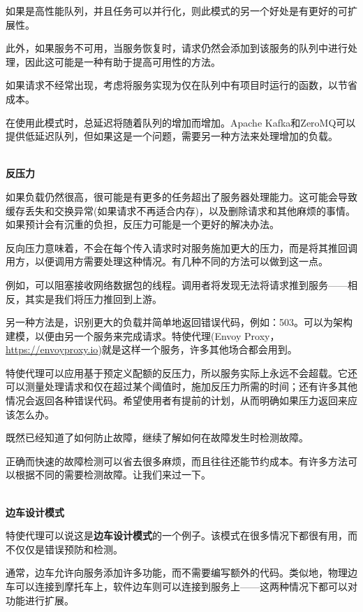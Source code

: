 如果是高性能队列，并且任务可以并行化，则此模式的另一个好处是有更好的可扩展性。

此外，如果服务不可用，当服务恢复时，请求仍然会添加到该服务的队列中进行处理，因此这可能是一种有助于提高可用性的方法。

如果请求不经常出现，考虑将服务实现为仅在队列中有项目时运行的函数，以节省成本。

在使用此模式时，总延迟将随着队列的增加而增加。Apache Kafka和ZeroMQ可以提供低延迟队列，但如果这是一个问题，需要另一种方法来处理增加的负载。

\hspace*{\fill} \\ %
\noindent
\textbf{反压力}

如果负载仍然很高，很可能是有更多的任务超出了服务器处理能力。这可能会导致缓存丢失和交换异常(如果请求不再适合内存)，以及删除请求和其他麻烦的事情。如果预计会有沉重的负担，反压力可能是一个更好的解决办法。

反向压力意味着，不会在每个传入请求时对服务施加更大的压力，而是将其推回调用方，以便调用方需要处理这种情况。有几种不同的方法可以做到这一点。

例如，可以阻塞接收网络数据包的线程。调用者将发现无法将请求推到服务——相反，其实是我们将压力推回到上游。

另一种方法是，识别更大的负载并简单地返回错误代码，例如：503。可以为架构建模，以便由另一个服务来完成请求。特使代理(Envoy Proxy，\url{https://envoyproxy.io})就是这样一个服务，许多其他场合都会用到。

特使代理可以应用基于预定义配额的反压力，所以服务实际上永远不会超载。它还可以测量处理请求和仅在超过某个阈值时，施加反压力所需的时间；还有许多其他情况会返回各种错误代码。希望使用者有提前的计划，从而明确如果压力返回来应该怎么办。

既然已经知道了如何防止故障，继续了解如何在故障发生时检测故障。


正确而快速的故障检测可以省去很多麻烦，而且往往还能节约成本。有许多方法可以根据不同的需要检测故障。让我们来过一下。

\hspace*{\fill} \\ %
\noindent
\textbf{边车设计模式}

特使代理可以说这是\textbf{边车设计模式}的一个例子。该模式在很多情况下都很有用，而不仅仅是错误预防和检测。

通常，边车允许向服务添加许多功能，而不需要编写额外的代码。类似地，物理边车可以连接到摩托车上，软件边车则可以连接到服务上——这两种情况下都可以对功能进行扩展。


